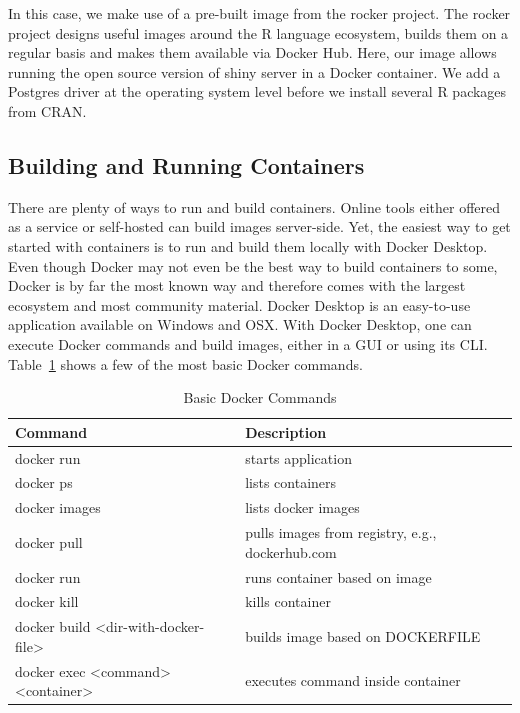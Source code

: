 \documentclass[
  12pt,
  letterpaper,
]{krantz}
\begin{document}
In this case, we make use of a pre-built image from the rocker project.
The rocker project designs useful images around the R language
ecosystem, builds them on a regular basis and makes them available via
Docker Hub. Here, our image allows running the open source version of
shiny server in a Docker container. We add a Postgres
driver at the operating system level before we install several R
packages from CRAN.

\hypertarget{building-and-running-containers}{%
\subsection{Building and Running
Containers}\label{building-and-running-containers}}

There are plenty of ways to run and build containers.
Online tools either offered as a service or self-hosted can build images
server-side. Yet, the easiest way to get started with containers is to
run and build them locally with Docker Desktop.\\
Even though Docker may not even be the best way to build containers to
some, Docker is by far the most known way and therefore comes with the
largest ecosystem and most community material. Docker Desktop is an
easy-to-use application available on Windows and OSX. With Docker
Desktop, one can execute Docker commands and build images, either in a
GUI or using its CLI. Table~\ref{tbl-dockerbasics} shows a few of the
most basic Docker commands.

\hypertarget{tbl-dockerbasics}{}
\begin{table}
\caption{\label{tbl-dockerbasics}Basic Docker Commands }\tabularnewline

\centering
\begin{tabular}{l>{\raggedright\arraybackslash}p{5.6cm}}
\toprule
Command & Description\\
\midrule
docker run & starts application\\
docker ps & lists containers\\
docker images & lists docker images\\
docker pull & pulls images from registry, e.g., dockerhub.com\\
docker run & runs container based on image\\
\addlinespace
docker kill & kills container\\
docker build <dir-with-docker-file> & builds image based on DOCKERFILE\\
docker exec <command> <container> & executes command inside container\\
\bottomrule
\end{tabular}
\end{table}
\end{document}
